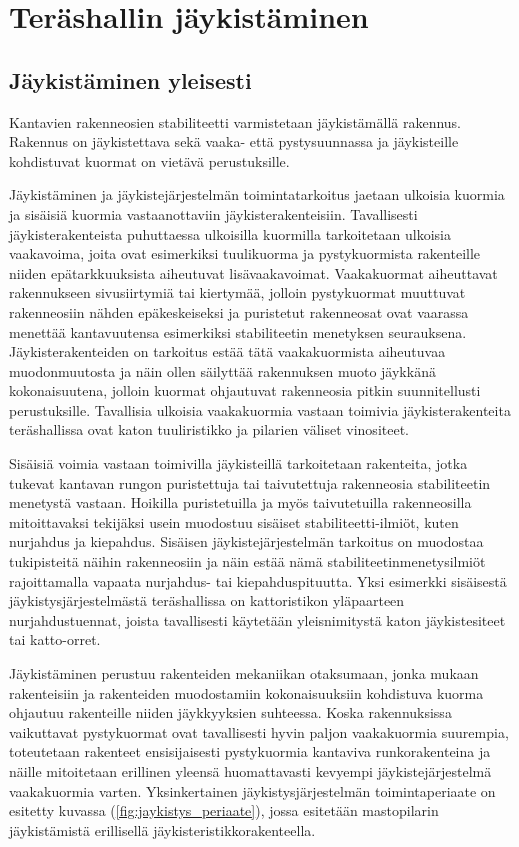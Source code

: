 \documentclass[12pt]{article}
\newenvironment{content}{\pagenumbering{arabic}}{}
\begin{document}
\begin{content}
\section{Teräshallin jäykistäminen}

\subsection{Jäykistäminen yleisesti}

Kantavien rakenneosien stabiliteetti varmistetaan jäykistämällä rakennus. Rakennus on jäykistettava sekä vaaka- että pystysuunnassa ja jäykisteille kohdistuvat kuormat on vietävä perustuksille. 

Jäykistäminen ja jäykistejärjestelmän toimintatarkoitus jaetaan ulkoisia kuormia ja sisäisiä kuormia vastaanottaviin jäykisterakenteisiin.  Tavallisesti jäykisterakenteista puhuttaessa ulkoisilla kuormilla tarkoitetaan ulkoisia vaakavoima, joita ovat esimerkiksi tuulikuorma ja pystykuormista rakenteille niiden epätarkkuuksista aiheutuvat lisävaakavoimat. Vaakakuormat aiheuttavat rakennukseen sivusiirtymiä tai kiertymää, jolloin pystykuormat muuttuvat rakenneosiin nähden epäkeskeiseksi ja puristetut rakenneosat ovat vaarassa menettää kantavuutensa esimerkiksi stabiliteetin menetyksen seurauksena. Jäykisterakenteiden on tarkoitus estää tätä vaakakuormista aiheutuvaa muodonmuutosta ja näin ollen säilyttää rakennuksen muoto jäykkänä kokonaisuutena, jolloin kuormat ohjautuvat rakenneosia pitkin suunnitellusti perustuksille. Tavallisia ulkoisia vaakakuormia vastaan toimivia jäykisterakenteita teräshallissa ovat katon tuuliristikko ja pilarien väliset vinositeet. \parencite{mazzolani}

Sisäisiä voimia vastaan toimivilla jäykisteillä tarkoitetaan rakenteita, jotka tukevat kantavan rungon puristettuja tai taivutettuja rakenneosia stabiliteetin menetystä vastaan. Hoikilla puristetuilla ja myös taivutetuilla rakenneosilla mitoittavaksi tekijäksi usein muodostuu sisäiset stabiliteetti-ilmiöt, kuten nurjahdus ja kiepahdus. Sisäisen jäykistejärjestelmän tarkoitus on muodostaa tukipisteitä näihin rakenneosiin ja näin estää nämä stabiliteetinmenetysilmiöt rajoittamalla vapaata nurjahdus- tai kiepahduspituutta. Yksi esimerkki sisäisestä jäykistysjärjestelmästä teräshallissa on kattoristikon yläpaarteen nurjahdustuennat, joista tavallisesti käytetään yleisnimitystä katon jäykistesiteet tai katto-orret. \parencite{mazzolani}

Jäykistäminen perustuu rakenteiden mekaniikan otaksumaan, jonka mukaan rakenteisiin ja rakenteiden muodostamiin kokonaisuuksiin kohdistuva kuorma ohjautuu rakenteille niiden jäykkyyksien suhteessa. Koska rakennuksissa vaikuttavat pystykuormat ovat tavallisesti hyvin paljon vaakakuormia suurempia, toteutetaan rakenteet ensisijaisesti pystykuormia kantaviva runkorakenteina ja näille mitoitetaan erillinen yleensä huomattavasti kevyempi jäykistejärjestelmä vaakakuormia varten. Yksinkertainen jäykistysjärjestelmän toimintaperiaate on esitetty kuvassa (\ref{fig:jaykistys_periaate}), jossa esitetään mastopilarin jäykistämistä erillisellä jäykisteristikkorakenteella.


\end{content}
\end{document}
